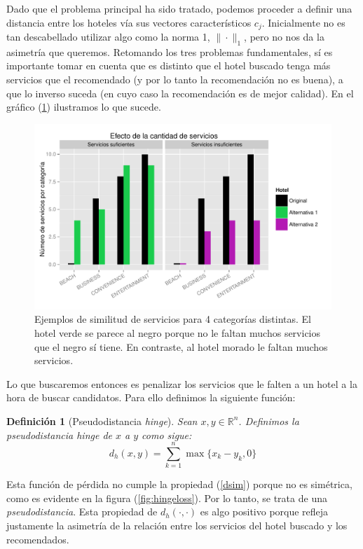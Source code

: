 \documentclass[12pt]{report}
\newcommand{\R}{\mathbb{R}}
\newtheorem{defn}{Definici\'on}[chapter]
\begin{document}
Dado que el problema principal ha sido tratado, podemos proceder a definir una distancia entre los hoteles vía sus vectores característicos $c_j$. Inicialmente no es tan descabellado utilizar algo como la norma 1, $\| \cdot \|_1$, pero no nos da la asimetría que queremos. Retomando los tres problemas fundamentales, sí es importante tomar en cuenta que es distinto que el hotel buscado tenga más servicios que el recomendado (y por lo tanto la recomendación no es buena), a que lo inverso suceda (en cuyo caso la recomendación es de mejor calidad). En el gráfico (\ref*{simserv}) ilustramos lo que sucede.
\begin{figure}[ht]
	\centering
	\includegraphics[width=\textwidth]{imagenes/simserv.pdf}
	\caption{\label{simserv} Ejemplos de similitud de servicios para 4 categorías distintas. El hotel verde se parece al negro porque no le faltan muchos servicios que el negro sí tiene. En contraste, al hotel morado le faltan muchos servicios.}
\end{figure}
Lo que buscaremos entonces es penalizar los servicios que le falten a un hotel a la hora de buscar candidatos. Para ello definimos la siguiente función:
\begin{defn}[Pseudodistancia \emph{hinge}]
Sean $x, y \in \R^n$. Definimos la pseudodistancia \emph{hinge} de $x$ a $y$ como sigue:
\[
d_h(x,y) = \sum_{k=1}^n \max\{x_k - y_k, 0\}
\]
\end{defn}
Esta función de pérdida no cumple la propiedad (\ref{dsim}) porque no es simétrica, como es evidente en la figura (\ref{fig:hingeloss}). Por lo tanto, se trata de una \emph{pseudodistancia}. Esta propiedad de $d_h(\cdot, \cdot)$ es algo positivo porque refleja justamente la asimetría de la relación entre los servicios del hotel buscado y los recomendados.
\end{document}
